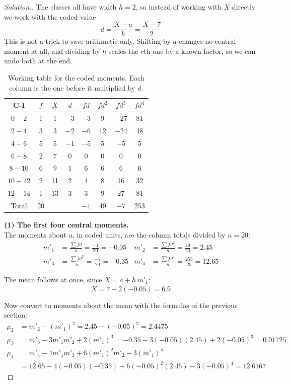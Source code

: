 \documentclass[11pt,a4paper]{article}
\theoremstyle{definition}
\newenvironment{solution}
  {\renewcommand{\qedsymbol}{}\begin{proof}[\textit{Solution}.]}
  {\end{proof}}
\begin{document}
\begin{solution}
The classes all have width $h=2$, so instead of working with $X$ directly we work with
the coded value
\[d=\frac{X-a}{h}=\frac{X-7}{2}\]
This is not a trick to save arithmetic only. Shifting by $a$ changes no central moment at
all, and dividing by $h$ scales the $r$th one by a known factor, so we can undo both at
the end.

\begin{table}[H]
\centering
\begin{tabular}{|c|c|c|c|c|c|c|c|}
\hline C-I & $f$ & $X$ & $d$ & $fd$ & $fd^2$ & $fd^3$ & $fd^4$\\
\hline
$0-2$   & 1 & 1  & $-3$ & $-3$ & 9  & $-27$ & 81\\
$2-4$   & 3 & 3  & $-2$ & $-6$ & 12 & $-24$ & 48\\
$4-6$   & 5 & 5  & $-1$ & $-5$ & 5  & $-5$  & 5\\
$6-8$   & 2 & 7  & 0    & 0    & 0  & 0     & 0\\
$8-10$  & 6 & 9  & 1    & 6    & 6  & 6     & 6\\
$10-12$ & 2 & 11 & 2    & 4    & 8  & 16    & 32\\
$12-14$ & 1 & 13 & 3    & 3    & 9  & 27    & 81\\
\hline
Total & 20 & & & $-1$ & 49 & $-7$ & 253\\
\hline
\end{tabular}
\caption{Working table for the coded moments. Each column is the one before it multiplied by $d$.}
\end{table}

\textbf{(1) The first four central moments.}\\
The moments about $a$, in coded units, are the column totals divided by $n=20$:
\begin{align*}
m'_1 &=\frac{\sum fd}{n}=\frac{-1}{20}=-0.05 &
m'_2 &=\frac{\sum fd^2}{n}=\frac{49}{20}=2.45\\
m'_3 &=\frac{\sum fd^3}{n}=\frac{-7}{20}=-0.35 &
m'_4 &=\frac{\sum fd^4}{n}=\frac{253}{20}=12.65
\end{align*}

The mean follows at once, since $\overline{X}=a+h\,m'_1$:
\[\overline{X}=7+2(-0.05)=6.9\]

Now convert to moments about the mean with the formulas of the previous section:
\begin{align*}
\mu_2 &=m'_2-(m'_1)^2 = 2.45-(-0.05)^2=2.4475\\
\mu_3 &=m'_3-3m'_1m'_2+2(m'_1)^3 = -0.35-3(-0.05)(2.45)+2(-0.05)^3=0.01725\\
\mu_4 &=m'_4-4m'_1m'_3+6(m'_1)^2m'_2-3(m'_1)^4\\
      &=12.65-4(-0.05)(-0.35)+6(-0.05)^2(2.45)-3(-0.05)^4=12.6167
\end{align*}


\end{solution}
\end{document}
